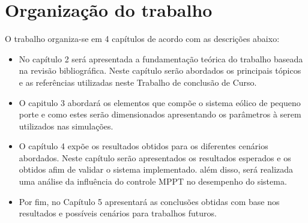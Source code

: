 \section{Organização do trabalho}


O trabalho organiza-se em 4 capítulos de acordo com as descrições abaixo:
\begin{itemize}
	\item No capítulo 2 será apresentada a fundamentação teórica do trabalho baseada na revisão bibliográfica. Neste capítulo serão abordados os principais tópicos e as referências utilizadas neste Trabalho de conclusão de Curso.
	\item O capitulo 3 abordará os elementos que compõe o sistema eólico de pequeno porte e como estes serão dimensionados apresentando os parâmetros à serem utilizados nas simulações.
	\item O capítulo 4 expõe os resultados obtidos para os diferentes cenários abordados. Neste capítulo serão apresentados os resultados esperados e os obtidos afim de validar o sistema implementado. além disso, será realizada uma análise da influência do controle MPPT no desempenho do sistema.
	\item Por fim, no Capítulo 5 apresentará as conclusões obtidas com base nos resultados e possíveis cenários para trabalhos futuros. 
\end{itemize}